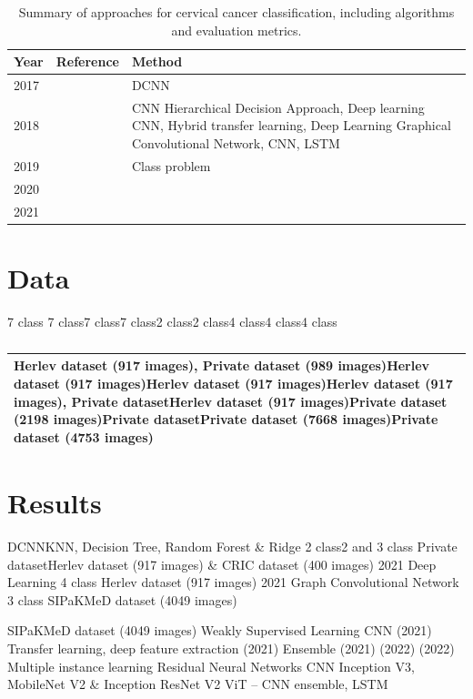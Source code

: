 \documentclass[final,5p,times,twocolumn,authoryear]{elsarticle}
\begin{document}
\begin{table}
\centering
\caption{Summary of approaches for cervical cancer classification, including algorithms and evaluation metrics.}
\label{tab:summary}
\begin{tabular}{lll}
\hline
Year & Reference & Method \\
\hline
2017 & \cite{ref42} & DCNN \\
2018 & \cite{ref43,ref37,ref44,ref45,ref46,ref47,ref48,ref49} & CNN Hierarchical Decision Approach, Deep learning CNN, Hybrid transfer learning, Deep Learning Graphical Convolutional Network, CNN, LSTM \\
2019 & \cite{ref50,ref19} & Class problem \\
2020 & & \\
2021 & & \\
\hline
\end{tabular}
\end{table}

\section{Data}
7 class
7 class7 class7 class2 class2 class4 class4 class4 class
\begin{table}
\centering
\caption{}
\label{}
\begin{tabular}{l}
\hline
Herlev dataset (917 images), Private dataset (989 images)Herlev dataset (917 images)Herlev dataset (917 images)Herlev dataset (917 images), Private datasetHerlev dataset (917 images)Private dataset (2198 images)Private datasetPrivate dataset (7668 images)Private dataset (4753 images) \\
\hline
\end{tabular}
\end{table}
\section{Results}
DCNNKNN, Decision Tree, Random Forest \& Ridge
2 class2 and 3 class
Private datasetHerlev dataset (917 images) \& CRIC dataset (400 images)
2021 \cite{51}
Deep Learning
4 class
Herlev dataset (917 images) \cite{52}
2021
Graph Convolutional Network
3 class
SIPaKMeD dataset (4049 images)

SIPaKMeD dataset (4049 images) \cite{ref53,ref54}
Weakly Supervised Learning CNN (2021) \cite{ref36}
Transfer learning, deep feature extraction (2021) \cite{ref55}
Ensemble (2021) \cite{ref56,ref39,ref57}
\cite{ref58} (2022)
\cite{ref59} (2022)
Multiple instance learning Residual Neural Networks CNN
Inception V3, MobileNet V2 \& Inception ResNet V2 ViT – CNN ensemble, LSTM
\end{document}
